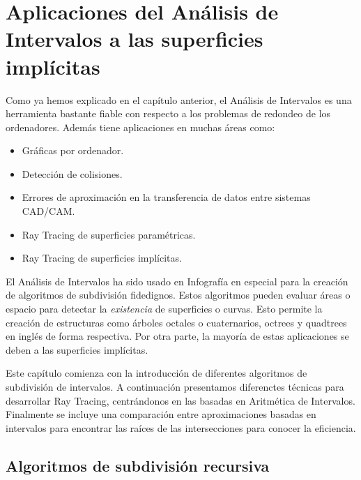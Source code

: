 \chapter{Aplicaciones del Análisis de Intervalos a las superficies implícitas}

Como ya hemos explicado en el capítulo anterior, el Análisis de Intervalos es una herramienta bastante fiable con respecto a los problemas de redondeo de los ordenadores. Además tiene aplicaciones en muchas áreas como:

\begin{itemize}
	\item Gráficas por ordenador.
	\item Detección de colisiones.
	\item Errores de aproximación en la transferencia de datos entre sistemas CAD/CAM.
	\item Ray Tracing de superficies paramétricas.
	\item Ray Tracing de superficies implícitas.
\end{itemize}

El Análisis de Intervalos ha sido usado en Infografía en especial para la creación de algoritmos de subdivisión fidedignos. Estos algoritmos pueden evaluar áreas o espacio para detectar la{ \em existencia} de superficies o curvas. Esto permite la creación de estructuras como árboles octales o cuaternarios, octrees y quadtrees en inglés de forma respectiva. Por otra parte, la mayoría de estas aplicaciones se deben a las superficies implícitas.
\par Este capítulo comienza con la introducción de diferentes algoritmos de subdivisión de intervalos. A continuación presentamos diferenctes técnicas para desarrollar Ray Tracing, centrándonos en las basadas en Aritmética de Intervalos. Finalmente se incluye una comparación entre aproximaciones basadas en intervalos para encontrar las raíces de las intersecciones para conocer la eficiencia.

\section{Algoritmos de subdivisión recursiva}

